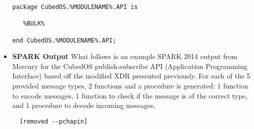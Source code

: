 \begin{itemize}
\begin{verbatim}
package CubedOS.%MODULENAME%.API is

   %BULK%

end CubedOS.%MODULENAME%.API;
\end{verbatim}
  
\item \textbf{SPARK Output} What follows is an example SPARK 2014 output from Mercury for the
  CubedOS publish-subscribe API (Application Programming Interface) based off the modified XDR
  presented previously. For each of the 5 provided message types, 2 functions and a procedure is
  generated: 1 function to encode messages, 1 function to check if the message is of the correct
  type, and 1 procedure to decode incoming messages.
\begin{verbatim}
  [removed --pchapin]
\end{verbatim}
  
\end{itemize}
